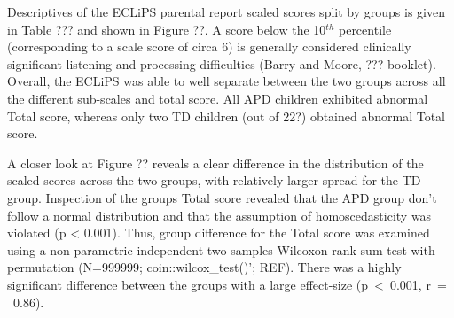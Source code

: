 \documentclass[a4paper, twoside]{templates/ociamthesis}
\begin{document}
Descriptives of the ECLiPS parental report scaled scores split by groups is given in Table ??? and shown in Figure ??. A score below the 10\(^{th}\) percentile (corresponding to a scale score of circa 6) is generally considered clinically significant listening and processing difficulties (Barry and Moore, ??? booklet). Overall, the ECLiPS was able to well separate between the two groups across all the different sub-scales and total score. All APD children exhibited abnormal Total score, whereas only two TD children (out of 22?) obtained abnormal Total score.

A closer look at Figure ?? reveals a clear difference in the distribution of the scaled scores across the two groups, with relatively larger spread for the TD group. Inspection of the groups Total score revealed that the APD group don't follow a normal distribution and that the assumption of homoscedasticity was violated (p \textless{} 0.001). Thus, group difference for the Total score was examined using a non-parametric independent two samples Wilcoxon rank-sum test with permutation (N=999999; coin::wilcox\_test()'; REF). There was a highly significant difference between the groups with a large effect-size (p~\textless~0.001, r~= ~0.86).
\end{document}
